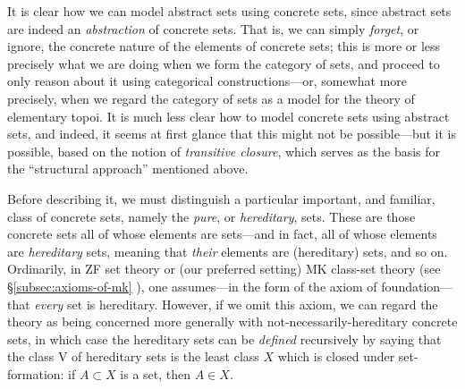 \documentclass{amsart}
\newcommand\rV{\mathrm{V}}
\newcommand\prerefpost[3]{%
  \texorpdfstring%
    {\hyperref[#2]{#1\ref*{#2}#3}}%
    {#1\ref*{#2}#3}%
}
\newcommand\sref[1]{\prerefpost{\S}{#1}{}}
\theoremstyle{definition}
\theoremstyle{remark}
\theoremstyle{plainwithref}
\begin{document}
It is clear how we can model abstract sets using concrete sets, since abstract sets are indeed an \emph{abstraction} of concrete sets.
That is, we can simply \emph{forget}, or ignore, the concrete nature of the elements of concrete sets; this is more or less precisely what we are doing when we form the category of sets, and proceed to only reason about it using categorical constructions---or, somewhat more precisely, when we regard the category of sets as a model for the theory of elementary topoi.
It is much less clear how to model concrete sets using abstract sets, and indeed, it seems at first glance that this might not be possible---but it is possible, based on the notion of \emph{transitive closure}, which serves as the basis for the ``structural approach'' mentioned above.

Before describing it, we must distinguish a particular important, and familiar, class of concrete sets, namely the \emph{pure}, or \emph{hereditary}, sets.
These are those concrete sets all of whose elements are sets---and in fact, all of whose elements are \emph{hereditary} sets, meaning that \emph{their} elements are (hereditary) sets, and so on.
Ordinarily, in ZF set theory or (our preferred setting) MK class-set theory (see \sref{subsec:axioms-of-mk}), one assumes---in the form of the axiom of foundation---that \emph{every} set is hereditary.
However, if we omit this axiom, we can regard the theory as being concerned more generally with not-necessarily-hereditary concrete sets, in which case the hereditary sets can be \emph{defined} recursively by saying that the class \( \rV \) of hereditary sets is the least class \( X \) which is closed under set-formation: if \( A \subset X \) is a set, then \( A \in X \).
\end{document}
